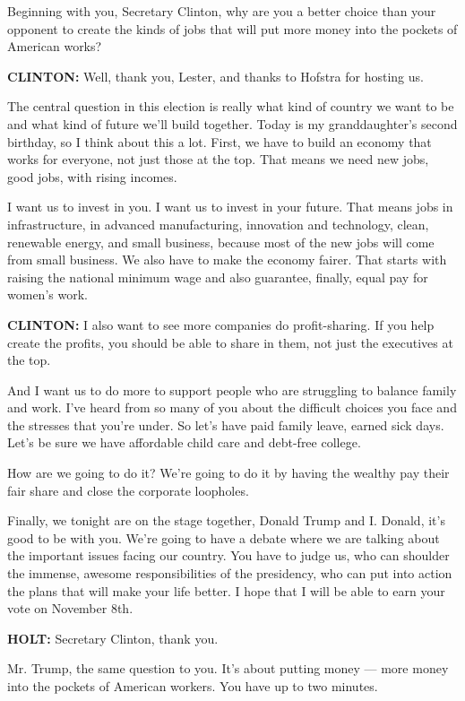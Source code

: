 Beginning with you, Secretary Clinton, why are you a better choice than
your opponent to create the kinds of jobs that will put more money into
the pockets of American works?

\textbf{CLINTON:} Well, thank you, Lester, and thanks to Hofstra for
hosting us.

The central question in this election is really what kind of country we
want to be and what kind of future we'll build together. Today is my
granddaughter's second birthday, so I think about this a lot. First, we
have to build an economy that works for everyone, not just those at the
top. That means we need new jobs, good jobs, with rising incomes.

I want us to invest in you. I want us to invest in your future. That
means jobs in infrastructure, in advanced manufacturing, innovation and
technology, clean, renewable energy, and small business, because most of
the new jobs will come from small business. We also have to make the
economy fairer. That starts with raising the national minimum wage and
also guarantee, finally, equal pay for women's work.

\textbf{CLINTON:} I also want to see more companies do profit-sharing.
If you help create the profits, you should be able to share in them, not
just the executives at the top.

And I want us to do more to support people who are struggling to balance
family and work. I've heard from so many of you about the difficult
choices you face and the stresses that you're under. So let's have paid
family leave, earned sick days. Let's be sure we have affordable child
care and debt-free college.

How are we going to do it? We're going to do it by having the wealthy
pay their fair share and close the corporate loopholes.

Finally, we tonight are on the stage together, Donald Trump and I.
Donald, it's good to be with you. We're going to have a debate where we
are talking about the important issues facing our country. You have to
judge us, who can shoulder the immense, awesome responsibilities of the
presidency, who can put into action the plans that will make your life
better. I hope that I will be able to earn your vote on November 8th.

\textbf{HOLT:} Secretary Clinton, thank you.

Mr. Trump, the same question to you. It's about putting money --- more
money into the pockets of American workers. You have up to two minutes.

